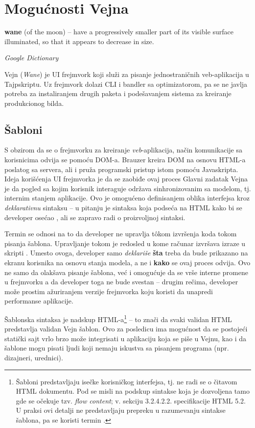 \chapter{Mogućnosti Vejna}

\epigraph{
  \textbf{wane} (of the moon) -- have a progressively smaller part of its visible surface illuminated, so that it appears to decrease in size.\footnotemark
}{\textsl{Google Dictionary}}


Vejn (\textsl{Wane}) je UI frejmvork koji služi za pisanje jednostraničnih veb-aplikacija u Tajpskriptu.
Uz frejmvork dolazi CLI i bandler sa optimizatorom, pa se ne javlja potreba za instaliranjem drugih paketa i podešavanjem sistema za kreiranje produkcionog bilda.

\section{Šabloni}

S obzirom da se o frejmvorku za kreiranje \emph{veb}-aplikacija, način komunikacije sa korisnicima odvija se pomoću DOM-a.
Brauzer kreira DOM na osnovu HTML-a poslatog sa servera, ali i pruža programski pristup istom pomoću Javaskripta.
Ideja korišćenja UI frejmvorka je da se zaobiđe ovaj proces
Glavni zadatak Vejna je da pogled sa kojim korisnik interaguje održava sinhronizovanim sa modelom, tj. internim stanjem aplikacije.
Ovo je omogućeno definisanjem oblika interfejsa kroz \emph{deklarativnu} sintaksu -- u pitanju je sintaksa koja podseća na HTML kako bi se developer osećao , ali se zapravo radi o proizvoljnoj sintaksi.

Termin  se odnosi na to da developer ne upravlja t\^okom izvršenja koda tokom pisanja šablona.
Upravljanje tokom je redosled u kome računar izvršava izraze u skripti \cite{mdn:glossary:control-flow}.
Umesto ovoga, developer samo \emph{deklariše} \textbf{šta} treba da bude prikazano na ekranu korisnika na osnovu stanja modela, a ne i \textbf{kako} se ovaj proces odvija.
Ovo ne samo da olakšava pisanje šablona, već i omogućuje da se vrše interne promene u frejmvorku a da developer toga ne bude svestan -- drugim rečima, developer može prostim ažuriranjem verzije frejmvorka koju koristi da unapredi performanse aplikacije.

Šablonska sintaksa je nadskup HTML-a\footnote{Šabloni predstavljaju isečke korisničkog interfejsa, tj. ne radi se o čitavom HTML dokumentu. Pod  se misli na podskup sintakse koja je dozvoljena tamo gde se očekuje tzv. \textsl{flow content}; v. sekciju 3.2.4.2.2. specifikacije HTML 5.2. U praksi ovi detalji ne predstavljaju prepreku u razumevanju sintakse šablona, pa se koristi termin .} -- to znači da svaki validan HTML predstavlja validan Vejn šablon.
Ovo za posledicu ima mogućnost da se postojeći statički sajt vrlo brzo može integrisati u aplikaciju koja se piše u Vejnu, kao i da šablone mogu pisati ljudi koji nemaju iskustva sa pisanjem programa (npr. dizajneri, urednici).


